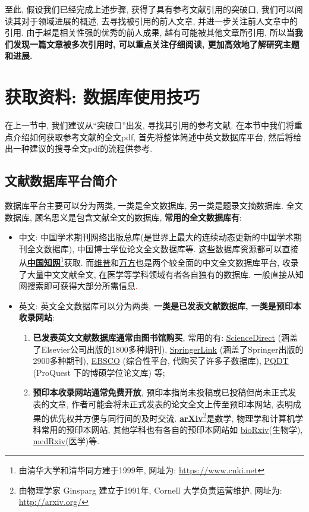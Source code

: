 \documentclass{formatBook}
\newcommand{\XG}[1]{\textcolor{red}{#1}}
\begin{document}
至此, 假设我们已经完成上述步骤, 获得了具有参考文献引用的突破口, 我们可以阅读其对于领域进展的概述, 去寻找被引用的前人文章, 并进一步关注前人文章中的引用. 由于越是相关性强的优秀的前人成果, 越有可能被其他文章所引用, 所以\textbf{当我们发现一篇文章被多次引用时, 可以重点关注仔细阅读, 更加高效地了解研究主题和进展.}

\section{获取资料: 数据库使用技巧}
在上一节中, 我们建议从``突破口''出发, 寻找其引用的参考文献. 在本节中我们将重点介绍如何获取参考文献的全文pdf, 首先将整体简述中英文数据库平台, 然后将给出一种建议的搜寻全文pdf的流程供参考.

\subsection{文献数据库平台简介}
数据库平台主要可以分为两类, 一类是全文数据库, 另一类是题录文摘数据库. 全文数据库, 顾名思义是包含文献全文的数据库, \textbf{常用的全文数据库有}:
\begin{itemize}
    \item 中文: 中国学术期刊网络出版总库(是世界上最大的连续动态更新的中国学术期刊全文数据库), 中国博士学位论文全文数据库等. 这些数据库资源都可以直接从\textbf{\href{https://www.cnki.net/}{中国知网}}\footnote{由清华大学和清华同方建于1999年, 网址为: \url{https://www.cnki.net}}获取. 而\href{http://www.cqvip.com/}{维普}和\href{https://new.wanfangdata.com.cn/index.html}{万方}也是两个较全面的中文全文数据库平台, 收录了大量中文文献全文, 在医学等学科领域有者各自独有的数据库. 一般直接从知网搜索即可获得大部分所需信息\XG{.}
    \item 英文: 英文全文数据库可以分为两类, \textbf{一类是已发表文献数据库, 一类是预印本收录网站}:
          \begin{enumerate}
              \item \textbf{已发表英文文献数据库通常由图书馆购买}, 常用的有: \href{https://www.sciencedirect.com/}{ScienceDirect} (涵盖了Elsevier公司出版的1800多种期刊), \href{https://link.springer.com/}{SpringerLink} (涵盖了Springer出版的2900多种期刊), \href{https://www.ebsco.com}{EBSCO} (综合性平台, 代购买了许多子数据库), \href{http://www.pqdtcn.com/}{PQDT}
                    (ProQuest 下的博硕学位论文库) 等;
              \item \textbf{预印本收录网站通常免费开放}, 预印本指尚未投稿或已投稿但尚未正式发表的文章, 作者可能会将未正式发表的论文全文上传至预印本网站, 表明成果的优先权并方便与同行间的及时交流. \textbf{\href{http://arxiv.org/}{arXiv}}\footnote{由物理学家 Ginsparg 建立于1991年, Cornell 大学负责运营维护, 网址为: \url{http://arxiv.org/}}是数学, 物理学和计算机学科常用的预印本网站, 其他学科也有各自的预印本网站如 \href{https://www.biorxiv.org/}{bioRxiv}(生物学), \href{https://www.medrxiv.org/}{medRxiv}(医学)等.
          \end{enumerate}
\end{itemize}
\end{document}
